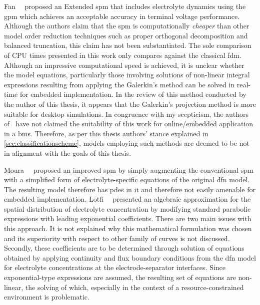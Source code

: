 Fan~\etal~\cite{Fan2016}   proposed   an   Extended  \gls{spm}   that   includes
electrolyte dynamics using  the \gls{gpm} which achieves  an acceptable accuracy
in terminal voltage  performance. Although the authors claim  that the \gls{spm}
is computationally  \emph{cheaper} than  other model order  reduction techniques
such as proper orthogonal decomposition  and balanced truncation, this claim has
not  been substantiated.  The sole  comparison of  CPU times  presented in  this
work  only compares  against  the classical  \gls{fdm}.  Although an  impressive
computational  speed is  achieved, it  is unclear  whether the  model equations,
particularly  those  involving  solutions  of  non-linear  integral  expressions
resulting from  applying the Galerkin's  method can  be solved in  real-time for
embedded implementation.  In the review of  this method conducted by  the author
of  this thesis,  it  appears  that the  Galerkin's  projection  method is  more
suitable  for  desktop  simulations.  In  congruence  with  my  scepticism,  the
authors  of~\cite{Fan2016} have  not claimed  the suitability  of this  work for
online/embedded  application  in a  \gls{bms}.  Therefore,  as per  this  thesis
authors' stance  explained in \cref{sec:classificationscheme},  models employing
such methods are deemed to be not in alignment with the goals of this thesis.

Moura~\etal~\cite{Moura2017} proposed an improved \gls{spm} by simply augmenting
the  conventional  \gls{spm}  with  a simplified  form  of  electrolyte-specific
equations of  the original  \gls{dfn} model. The  resulting model  therefore has
\glspl{pde} in it and therefore not easily amenable for embedded implementation.
Lotfi~\etal~\cite{Lotfi2017}  presented  an   algebraic  approximation  for  the
spatial  distribution   of  electrolyte  concentration  by   modifying  standard
parabolic expressions with leading exponential  coefficients. There are two main
issues with this approach. It is not explained why this mathematical formulation
was chosen  and its superiority  with respect to other  family of curves  is not
discussed. Secondly, these coefficients are to be determined through solution of
equations obtained by applying continuity  and flux boundary conditions from the
\gls{dfn}  model  for  electrolyte  concentrations  at  the  electrode-separator
interfaces. Since exponential-type expressions are assumed, the resulting set of
equations are non-linear,  the solving of which, especially in  the context of a
resource-constrained environment is problematic.

